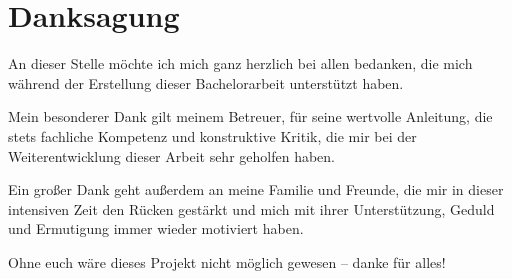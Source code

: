 \vfill
\section*{Danksagung}
\setlength{\parskip}{18pt plus 2pt minus 1pt}
An dieser Stelle möchte ich mich ganz herzlich bei allen bedanken, die mich während der Erstellung dieser Bachelorarbeit unterstützt haben.

Mein besonderer Dank gilt meinem Betreuer,  für seine wertvolle Anleitung, die stets fachliche Kompetenz und konstruktive Kritik, die mir bei der Weiterentwicklung dieser Arbeit sehr geholfen haben.

Ein großer Dank geht außerdem an meine Familie und Freunde, die mir in dieser intensiven Zeit den Rücken gestärkt und mich mit ihrer Unterstützung, Geduld und Ermutigung immer wieder motiviert haben.

Ohne euch wäre dieses Projekt nicht möglich gewesen – danke für alles!
\setlength{\parskip}{0pt}
\vfill
